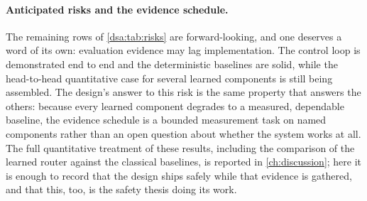 \paragraph{Anticipated risks and the evidence schedule.}
The remaining rows of \cref{dsa:tab:risks} are forward-looking, and one deserves a word
of its own: evaluation evidence may lag implementation. The control loop is
demonstrated end to end and the deterministic baselines are solid, while the
head-to-head quantitative case for several learned components is still being assembled.
The design's answer to this risk is the same property that answers the others: because
every learned component degrades to a measured, dependable baseline, the evidence
schedule is a bounded measurement task on named components rather than an open question
about whether the system works at all. The full quantitative treatment of these
results, including the comparison of the learned router against the classical
baselines, is reported in \cref{ch:discussion}; here it is enough to record that the
design ships safely while that evidence is gathered, and that this, too, is the safety
thesis doing its work.

